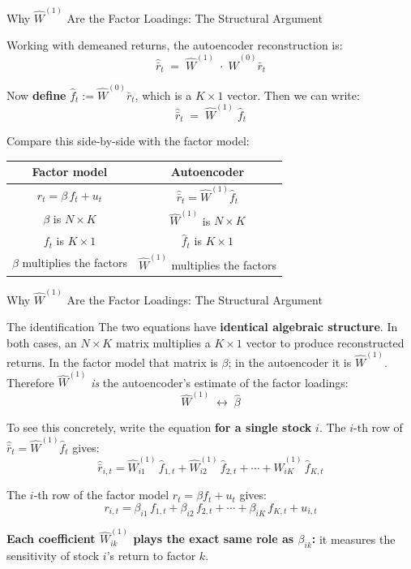 \documentclass[aspectratio=169]{beamer}
\begin{document}
%
%
\begin{frame}{Why $\hat{W}^{(1)}$ Are the Factor Loadings: The Structural Argument}

Working with demeaned returns, the autoencoder reconstruction is:
\[
\hat{\bar{r}}_t \;=\; \hat{W}^{(1)} \;\cdot\; \hat{W}^{(0)} \bar{r}_t
\]

Now \textbf{define} $\hat{f}_t := \hat{W}^{(0)} \bar{r}_t$, which is a $K \times 1$ vector. Then we can write:
\[
\hat{\bar{r}}_t \;=\; \hat{W}^{(1)} \; \hat{f}_t
\]

Compare this side-by-side with the factor model:

\vspace{0.3em}

\begin{center}
\renewcommand{\arraystretch}{1.6}
\begin{tabular}{c @{\hskip 2em} c}
\textbf{Factor model} & \textbf{Autoencoder} \\
\hline
$r_t = \beta \, f_t + u_t$ & $\hat{\bar{r}}_t = \hat{W}^{(1)} \hat{f}_t$ \\
$\beta$ is $N \times K$ & $\hat{W}^{(1)}$ is $N \times K$ \\
$f_t$ is $K \times 1$ & $\hat{f}_t$ is $K \times 1$ \\
$\beta$ multiplies the factors & $\hat{W}^{(1)}$ multiplies the factors \\
\hline
\end{tabular}
\end{center}
\end{frame}
%
%
\begin{frame}{Why $\hat{W}^{(1)}$ Are the Factor Loadings: The Structural Argument}

\begin{block}{The identification}
The two equations have \textbf{identical algebraic structure}. In both cases, an $N \times K$ matrix multiplies a $K \times 1$ vector to produce reconstructed returns. In the factor model that matrix is $\beta$; in the autoencoder it is $\hat{W}^{(1)}$. Therefore $\hat{W}^{(1)}$ \textit{is} the autoencoder's estimate of the factor loadings:
\vspace{-0.3em}
\[
\hat{W}^{(1)} \;\longleftrightarrow\; \hat{\beta}
\]
\end{block}
\small
To see this concretely, write the equation \textbf{for a single stock} $i$. The $i$-th row of $\hat{\bar{r}}_t = \hat{W}^{(1)}\hat{f}_t$ gives:
\[
\hat{\bar{r}}_{i,t} = \hat{W}^{(1)}_{i1}\,\hat{f}_{1,t} + \hat{W}^{(1)}_{i2}\,\hat{f}_{2,t} + \cdots + \hat{W}^{(1)}_{iK}\,\hat{f}_{K,t}
\]

The $i$-th row of the factor model $r_t = \beta f_t + u_t$ gives:
\[
r_{i,t} = \beta_{i1}\,f_{1,t} + \beta_{i2}\,f_{2,t} + \cdots + \beta_{iK}\,f_{K,t} + u_{i,t}
\]

\vspace{0.3em}

\textbf{Each coefficient $\hat{W}^{(1)}_{ik}$ plays the exact same role as $\beta_{ik}$:} it measures the sensitivity of stock $i$'s return to factor $k$.

\end{frame}
\end{document}
